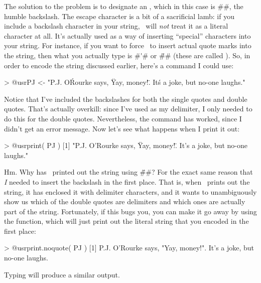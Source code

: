 The solution to the problem is to designate an , which in this case is \rtextverb#\#, the humble backslash. The escape character is a bit of a sacrificial lamb: if you include a backslash character in your string, \R\ will {\it not} treat it as a literal character at all. It's actually used as a way of inserting ``special'' characters into your string. For instance, if you want to force \R\ to insert actual quote marks into the string, then what you actually type is \rtextverb#\'# or \rtextverb#\"# (these are called ). So, in order to encode the string discussed earlier, here's a command I could use:
\begin{rblock1}
> @usr{PJ <- "P.J. O\'Rourke says, \"Yay, money!\". It\'s a joke, but no-one laughs."}
\end{rblock1} 
Notice that I've included the backslashes for both the single quotes and double quotes. That's actually overkill: since I've used  as my delimiter, I only needed to do this for the double quotes. Nevertheless, the command has worked, since I didn't get an error message. Now let's see what happens when I print it out:
\begin{rblock1}
> @usr{print( PJ )}
[1] "P.J. O'Rourke says, \"Yay, money!\". It's a joke, but no-one laughs."
\end{rblock1}
Hm. Why has \R\ printed out the string using \rtextverb#\"#? For the exact same reason that {\it I} needed to insert the backslash in the first place. That is, when \R\ prints out the  string, it has enclosed it with delimiter characters, and it wants to unambiguously show us which of the double quotes are delimiters and which ones are actually part of the string. Fortunately, if this bugs you, you can make it go away by using the  function, which will just print out the literal string that you encoded in the first place:
\begin{rblock1}
> @usr{print.noquote( PJ )}
[1] P.J. O'Rourke says, "Yay, money!". It's a joke, but no-one laughs.
\end{rblock1}
Typing  will produce a similar output.

